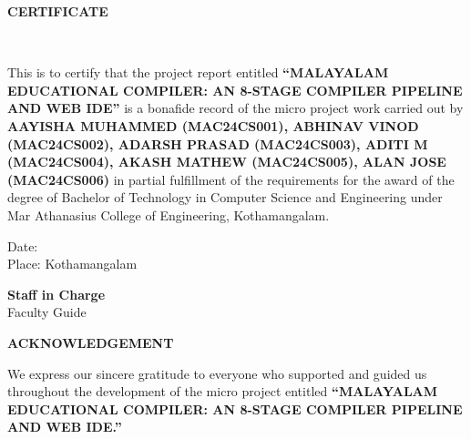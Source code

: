 \documentclass[12pt,a4paper]{report}
\begin{document}
\newpage
{}
\setcounter{page}{1}

\begin{center}
    {\Large \textbf{CERTIFICATE}}\\[1.0cm]
    
    \\[1.0cm]
\end{center}

\noindent This is to certify that the project report entitled \textbf{“MALAYALAM EDUCATIONAL COMPILER: AN 8-STAGE COMPILER PIPELINE AND WEB IDE”} is a bonafide record of the micro project work carried out by \textbf{AAYISHA MUHAMMED (MAC24CS001), ABHINAV VINOD (MAC24CS002), ADARSH PRASAD (MAC24CS003), ADITI M (MAC24CS004), AKASH MATHEW (MAC24CS005), ALAN JOSE (MAC24CS006)} in partial fulfillment of the requirements for the award of the degree of Bachelor of Technology in Computer Science and Engineering under Mar Athanasius College of Engineering, Kothamangalam.

\vspace{3.5cm}

\noindent
\begin{minipage}{0.5\textwidth}
    Date:\\
    Place: Kothamangalam
\end{minipage}
\hfill
\begin{minipage}{0.45\textwidth}
    \centering
    \textbf{Staff in Charge}\\
    \vspace{0.8cm}
    Faculty Guide
\end{minipage}

\newpage
\begin{center}
    {\Large \textbf{ACKNOWLEDGEMENT}}\\[1.0cm]
\end{center}

\noindent We express our sincere gratitude to everyone who supported and guided us throughout the development of the micro project entitled \textbf{“MALAYALAM EDUCATIONAL COMPILER: AN 8-STAGE COMPILER PIPELINE AND WEB IDE.”}
\end{document}
